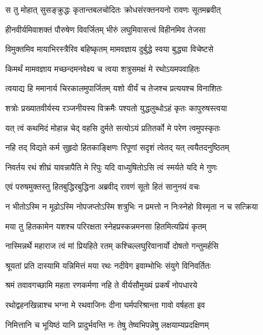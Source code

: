 
\twolineshloka
{स तु मोहात् सुसङ्क्रुद्धः कृतान्तबलचोदितः}
{क्रोधसंरक्तनयनो रावणः सूतमब्रवीत्} %

\twolineshloka
{हीनवीर्यमिवाशक्तं पौरुषेण विवर्जितम्}
{भीरुं लघुमिवासत्त्वं विहीनमिव तेजसा} %

\twolineshloka
{विमुक्तमिव मायाभिरस्त्रैरिव बहिष्कृतम्}
{मामवज्ञाय दुर्बुद्धे स्वया बुद्ध्या विचेष्टसे} %

\twolineshloka
{किमर्थं मामवज्ञाय मच्छन्दमनवेक्ष्य च}
{त्वया शत्रुसमक्षं मे रथोऽयमपवाहितः} %

\twolineshloka
{त्वयाद्य हि ममानार्य चिरकालमुपार्जितम्}
{यशो वीर्यं च तेजश्च प्रत्ययश्च विनाशितः} %

\twolineshloka
{शत्रोः प्रख्यातवीर्यस्य रञ्जनीयस्य विक्रमैः}
{पश्यतो युद्धलुब्धोऽहं कृतः कापुरुषस्त्वया} %

\twolineshloka
{यत् त्वं कथमिदं मोहान्न चेद् वहसि दुर्मते}
{सत्योऽयं प्रतितर्को मे परेण त्वमुपस्कृतः} %

\twolineshloka
{नहि तद् विद्यते कर्म सुहृदो हितकाङ्क्षिणः}
{रिपूणां सदृशं त्वेतद् यत् त्वयैतदनुष्ठितम्} %

\twolineshloka
{निवर्तय रथं शीघ्रं यावन्नापैति मे रिपुः}
{यदि वाध्युषितोऽसि त्वं स्मर्यते यदि मे गुणः} %

\twolineshloka
{एवं परुषमुक्तस्तु हितबुद्धिरबुद्धिना}
{अब्रवीद् रावणं सूतो हितं सानुनयं वचः} %

\twolineshloka
{न भीतोऽस्मि न मूढोऽस्मि नोपजप्तोऽस्मि शत्रुभिः}
{न प्रमत्तो न निःस्नेहो विस्मृता न च सत्क्रिया} %

\twolineshloka
{मया तु हितकामेन यशश्च परिरक्षता}
{स्नेहप्रस्कन्नमनसा हितमित्यप्रियं कृतम्} %

\twolineshloka
{नास्मिन्नर्थे महाराज त्वं मां प्रियहिते रतम्}
{कश्चिल्लघुरिवानार्यो दोषतो गन्तुमर्हसि} %

\twolineshloka
{श्रूयतां प्रति दास्यामि यन्निमित्तं मया रथः}
{नदीवेग इवाम्भोभिः संयुगे विनिवर्तितः} %

\twolineshloka
{श्रमं तवावगच्छामि महता रणकर्मणा}
{नहि ते वीर्यसौमुख्यं प्रकर्षं नोपधारये} %

\twolineshloka
{रथोद्वहनखिन्नाश्च भग्ना मे रथवाजिनः}
{दीना घर्मपरिश्रान्ता गावो वर्षहता इव} %

\twolineshloka
{निमित्तानि च भूयिष्ठं यानि प्रादुर्भवन्ति नः}
{तेषु तेष्वभिपन्नेषु लक्षयाम्यप्रदक्षिणम्} %

